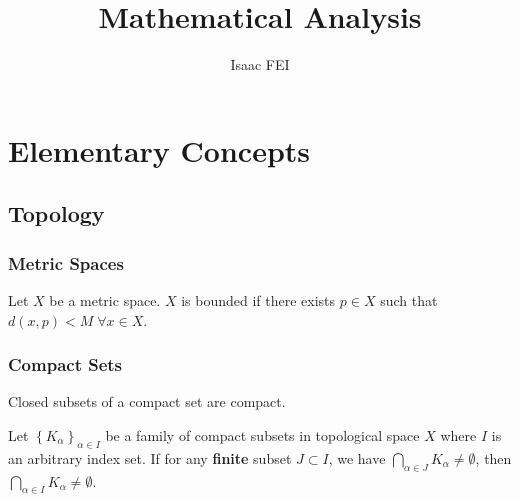 \documentclass[thmcnt=section, 12pt]{elegantbook}
\title{Mathematical Analysis}
\author{Isaac FEI}
\begin{document}
\maketitle

\frontmatter
\tableofcontents
\mainmatter






\part{Elementary Concepts}




\chapter{Topology}


\section{Metric Spaces}


\begin{definition}
    Let $X$ be a metric space. $X$ is bounded if there exists $p \in X$ such that $d(x, p) < M \; \forall x \in X$.
\end{definition}


\section{Compact Sets}


\begin{theorem} \label{thm:9}
    Closed subsets of a compact set are compact.
\end{theorem}


\begin{theorem} \label{thm:10}
    Let $\left\{K_\alpha\right\}_{\alpha \in I}$ be a family of compact subsets in topological space $X$ where $I$ is an arbitrary index set. If for any \textbf{finite} subset $J \subset I$, we have $\bigcap_{\alpha \in J} K_\alpha \neq \emptyset$, then $\bigcap_{\alpha \in I} K_\alpha \neq \emptyset$.
\end{theorem}
\end{document}
